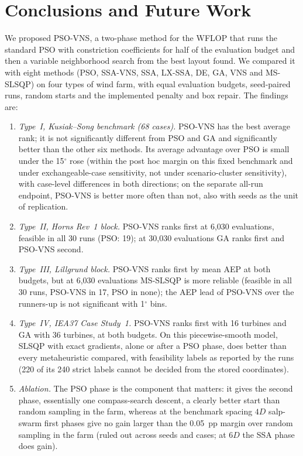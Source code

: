 \section{Conclusions and Future Work}
\label{sec:conclusion}
We proposed PSO-VNS, a two-phase method for the WFLOP that runs the standard PSO with constriction coefficients for half of the evaluation budget and then a variable neighborhood search from the best layout found. We compared it with eight methods (PSO, SSA-VNS, SSA, LX-SSA, DE, GA, VNS and MS-SLSQP) on four types of wind farm, with equal evaluation budgets, seed-paired runs, random starts and the implemented penalty and box repair. The findings are:
\begin{enumerate}
\item \emph{Type~I, Kusiak--Song benchmark (68 cases).} PSO-VNS has the best average rank; it is not significantly different from PSO and GA and significantly better than the other six methods. Its average advantage over PSO is small under the 15$^\circ$ rose (within the post hoc margin on this fixed benchmark and under exchangeable-case sensitivity, not under scenario-cluster sensitivity), with case-level differences in both directions; on the separate all-run endpoint, PSO-VNS is better more often than not, also with seeds as the unit of replication.
\item \emph{Type~II, Horns Rev~1 block.} PSO-VNS ranks first at 6,030 evaluations, feasible in all 30 runs (PSO: 19); at 30,030 evaluations GA ranks first and PSO-VNS second.
\item \emph{Type~III, Lillgrund block.} PSO-VNS ranks first by mean AEP at both budgets, but at 6,030 evaluations MS-SLSQP is more reliable (feasible in all 30 runs, PSO-VNS in 17, PSO in none); the AEP lead of PSO-VNS over the runners-up is not significant with 1$^\circ$ bins.
\item \emph{Type~IV, IEA37 Case Study~1.} PSO-VNS ranks first with 16 turbines and GA with 36 turbines, at both budgets. On this piecewise-smooth model, SLSQP with exact gradients, alone or after a PSO phase, does better than every metaheuristic compared, with feasibility labels as reported by the runs (220 of its 240 strict labels cannot be decided from the stored coordinates).
\item \emph{Ablation.} The PSO phase is the component that matters: it gives the second phase, essentially one compass-search descent, a clearly better start than random sampling in the farm, whereas at the benchmark spacing $4D$ salp-swarm first phases give no gain larger than the 0.05~pp margin over random sampling in the farm (ruled out across seeds and cases; at $6D$ the SSA phase does gain).

\end{enumerate}
